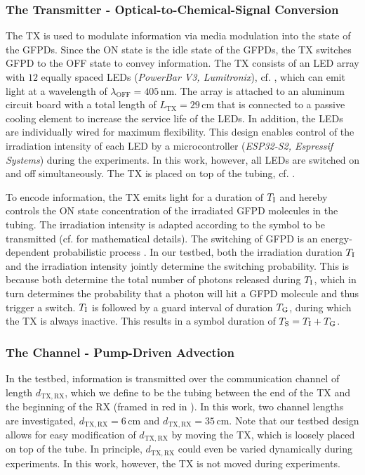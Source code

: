 \subsubsection{The Transmitter - Optical-to-Chemical-Signal Conversion}\label{subsubsec:tx}
\scaleSubsubsectionBelow
%
The \ac{TX} is used to modulate information via media modulation into the state of the \acp{GFPD}. Since the ON state is the idle state of the \acp{GFPD}, the \ac{TX} switches \ac{GFPD} to the OFF state to convey information.
The \ac{TX} consists of an \ac{LED} array with $12$ equally spaced \acp{LED} (\textit{PowerBar V3, Lumitronix}), cf. , which can emit light at a wavelength of $\lambda_\mathrm{OFF} = 405 \, \si{\nano\meter}$. The array is attached to an aluminum circuit board with a total length of $L_\mathrm{TX} = 29 \,\si{\cm}$ that is connected to a passive cooling element to increase the service life of the \acp{LED}. In addition, the \acp{LED} are individually wired for maximum flexibility. This design enables control of the irradiation intensity of each \ac{LED} by a microcontroller (\textit{ESP32-S2, Espressif Systems}) during the experiments. In this work, however, all \acp{LED} are switched on and off simultaneously.
The \ac{TX} is placed on top of the tubing, cf. .

To encode information, the \ac{TX} emits light for a duration of $T_{\mathrm{I}}$ and hereby controls the ON state concentration of the irradiated \ac{GFPD} molecules in the tubing. The irradiation intensity is adapted according to the symbol to be transmitted (cf.  for mathematical details). The switching of \ac{GFPD} is an energy-dependent probabilistic process \cite{brakemann2011reversibly, Brand2022MediaModulation}. In our testbed, both the irradiation duration $T_{\mathrm{I}}$ and the irradiation intensity jointly determine the switching probability. This is because both determine the total number of photons released during $T_{\mathrm{I}}$, which in turn determines the probability that a photon will hit a \ac{GFPD} molecule and thus trigger a switch.
$T_{\mathrm{I}}$ is followed by a guard interval of duration $T_{\mathrm{G}}$, during which the \ac{TX} is always inactive. This results in a symbol duration of $T_{\mathrm{S}} = T_{\mathrm{I}} + T_{\mathrm{G}}$.
%
\scaleSubsubsection
\subsubsection{The Channel - Pump-Driven Advection}\label{subsubsec:channel}
\scaleSubsubsectionBelow
In the testbed, information is transmitted over the communication channel of length $d_{\mathrm{TX},\mathrm{RX}}$, which we define to be the tubing between the end of the \ac{TX} and the beginning of the \ac{RX} (framed in red in ). In this work, two channel lengths are investigated, $d_{\mathrm{TX},\mathrm{RX}} = 6 \, \si{\centi\meter}$ and $d_{\mathrm{TX},\mathrm{RX}} = 35 \, \si{\centi\meter}$. Note that our testbed design allows for easy modification of $d_{\mathrm{TX},\mathrm{RX}}$ by moving the \ac{TX}, which is loosely placed on top of the tube. In principle, $d_{\mathrm{TX},\mathrm{RX}}$ could even be varied dynamically during experiments. In this work, however, the \ac{TX} is not moved during experiments.

